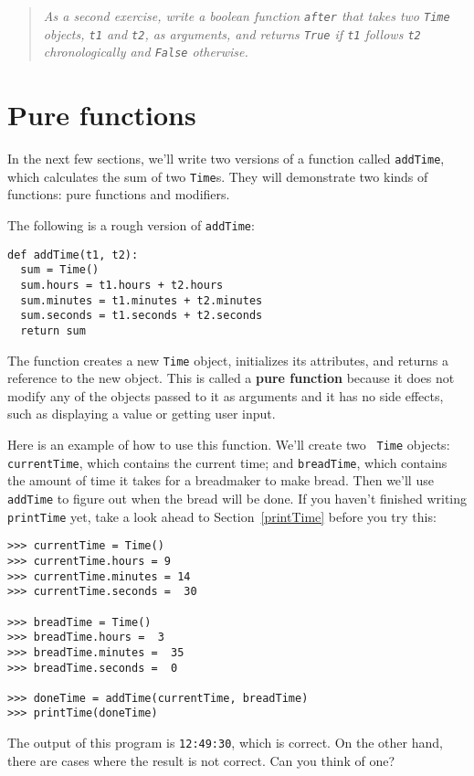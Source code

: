 \begin{quote}
{\em As a second exercise, write a boolean function {\tt after} that
takes two {\tt Time} objects, {\tt t1} and {\tt t2}, as arguments, and
returns {\tt True} if {\tt t1} follows {\tt t2} chronologically and
{\tt False} otherwise.}
\end{quote}


\section{Pure functions}

In the next few sections, we'll write two versions of a function
called {\tt addTime}, which calculates the sum of two {\tt Time}s.
They will demonstrate two kinds of functions: pure functions and
modifiers.

The following is a rough version of {\tt addTime}:

\beforeverb
\begin{verbatim}
def addTime(t1, t2):
  sum = Time()
  sum.hours = t1.hours + t2.hours
  sum.minutes = t1.minutes + t2.minutes
  sum.seconds = t1.seconds + t2.seconds
  return sum
\end{verbatim}
\afterverb
%
The function creates a new {\tt Time} object, initializes its
attributes, and returns a reference to the new object.  This is called
a {\bf pure function} because it does not modify any of the objects
passed to it as arguments and it has no side effects, such as
displaying a value or getting user input.

Here is an example of how to use this function.  We'll create two {\tt
Time} objects: {\tt currentTime}, which contains the current time; and
{\tt breadTime}, which contains the amount of time it takes for a
breadmaker to make bread.  Then we'll use {\tt addTime} to figure out
when the bread will be done.  If you haven't finished writing {\tt
printTime} yet, take a look ahead to Section~\ref{printTime} before
you try this:

\beforeverb
\begin{verbatim}
>>> currentTime = Time()
>>> currentTime.hours = 9
>>> currentTime.minutes = 14
>>> currentTime.seconds =  30

>>> breadTime = Time()
>>> breadTime.hours =  3
>>> breadTime.minutes =  35
>>> breadTime.seconds =  0

>>> doneTime = addTime(currentTime, breadTime)
>>> printTime(doneTime)
\end{verbatim}
\afterverb
%
The output of this program is {\tt 12:49:30}, which is correct. On the
other hand, there are cases where the result is not correct.  Can you
think of one?

